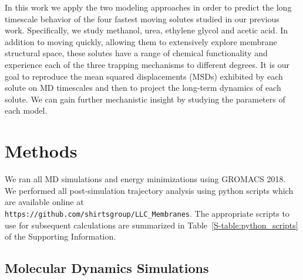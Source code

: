 \documentclass{article}
\begin{document}
  In this work we apply the two modeling approaches in order to predict the long
  timescale behavior of the four fastest moving solutes studied in our previous work.
  Specifically, we study methanol, urea, ethylene glycol and acetic acid. In addition
  to moving quickly, allowing them to extensively explore membrane structural space,
  these solutes have a range of chemical functionality and experience each of the 
  three trapping mechanisms to different degrees. It is our goal to reproduce
  the mean squared displacements (MSDs) exhibited by each solute on MD timescales and
  then to project the long-term dynamics of each solute. We can gain further
  mechanistic insight by studying the parameters of each model. 
  
%  

  \section{Methods}
    
  We ran all MD simulations and energy minimizations using GROMACS 2018. 
  ~\cite{bekker_gromacs:_1993,berendsen_gromacs:_1995,van_der_spoel_gromacs:_2005,hess_gromacs_2008}
  We performed all post-simulation trajectory analysis using python scripts which 
  are available online at \\ \texttt{https://github.com/shirtsgroup/LLC\_Membranes}.
  The appropriate scripts to use for subsequent calculations are summarized in 
  Table~\ref{S-table:python_scripts} of the Supporting Information.
  
  \subsection{Molecular Dynamics Simulations}
\end{document}
